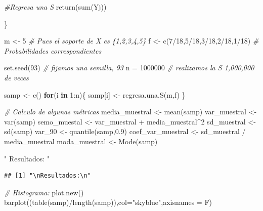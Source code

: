 \documentclass[
]{article}
\newenvironment{Shaded}{\begin{snugshade}}{\end{snugshade}}
\newcommand{\AttributeTok}[1]{\textcolor[rgb]{0.77,0.63,0.00}{#1}}
\newcommand{\CommentTok}[1]{\textcolor[rgb]{0.56,0.35,0.01}{\textit{#1}}}
\newcommand{\ControlFlowTok}[1]{\textcolor[rgb]{0.13,0.29,0.53}{\textbf{#1}}}
\newcommand{\DecValTok}[1]{\textcolor[rgb]{0.00,0.00,0.81}{#1}}
\newcommand{\FloatTok}[1]{\textcolor[rgb]{0.00,0.00,0.81}{#1}}
\newcommand{\FunctionTok}[1]{\textcolor[rgb]{0.00,0.00,0.00}{#1}}
\newcommand{\NormalTok}[1]{#1}
\newcommand{\OtherTok}[1]{\textcolor[rgb]{0.56,0.35,0.01}{#1}}
\newcommand{\SpecialCharTok}[1]{\textcolor[rgb]{0.00,0.00,0.00}{#1}}
\newcommand{\StringTok}[1]{\textcolor[rgb]{0.31,0.60,0.02}{#1}}
\begin{document}
\begin{Shaded}
\begin{Highlighting}[]
  \CommentTok{\#Regresa una S}
  \FunctionTok{return}\NormalTok{(}\FunctionTok{sum}\NormalTok{(Yj))}
  
\NormalTok{\}}

\NormalTok{m }\OtherTok{\textless{}{-}} \DecValTok{5} \CommentTok{\# Pues el soporte de X es \{1,2,3,4,5\}}
\NormalTok{f }\OtherTok{\textless{}{-}} \FunctionTok{c}\NormalTok{(}\DecValTok{7}\SpecialCharTok{/}\DecValTok{18}\NormalTok{,}\DecValTok{5}\SpecialCharTok{/}\DecValTok{18}\NormalTok{,}\DecValTok{3}\SpecialCharTok{/}\DecValTok{18}\NormalTok{,}\DecValTok{2}\SpecialCharTok{/}\DecValTok{18}\NormalTok{,}\DecValTok{1}\SpecialCharTok{/}\DecValTok{18}\NormalTok{) }\CommentTok{\# Probabilidades correspondientes}

\FunctionTok{set.seed}\NormalTok{(}\DecValTok{93}\NormalTok{) }\CommentTok{\# fijamos una semilla, 93}
\NormalTok{n }\OtherTok{=} \DecValTok{1000000} \CommentTok{\# realizamos la S 1,000,000 de veces}

\NormalTok{samp }\OtherTok{\textless{}{-}} \FunctionTok{c}\NormalTok{()}
\ControlFlowTok{for}\NormalTok{(i }\ControlFlowTok{in} \DecValTok{1}\SpecialCharTok{:}\NormalTok{n)\{}
\NormalTok{  samp[i] }\OtherTok{\textless{}{-}} \FunctionTok{regresa.una.S}\NormalTok{(m,f)}
\NormalTok{\}}

\CommentTok{\# Calculo de algunas métricas}
\NormalTok{media\_muestral }\OtherTok{\textless{}{-}} \FunctionTok{mean}\NormalTok{(samp)}
\NormalTok{var\_muestral }\OtherTok{\textless{}{-}} \FunctionTok{var}\NormalTok{(samp)}
\NormalTok{semo\_muestal }\OtherTok{\textless{}{-}}\NormalTok{ var\_muestral }\SpecialCharTok{+}\NormalTok{ media\_muestral}\SpecialCharTok{\^{}}\DecValTok{2}
\NormalTok{sd\_muestral }\OtherTok{\textless{}{-}}  \FunctionTok{sd}\NormalTok{(samp)}
\NormalTok{var\_90 }\OtherTok{\textless{}{-}} \FunctionTok{quantile}\NormalTok{(samp,}\FloatTok{0.9}\NormalTok{)}
\NormalTok{coef\_var\_muestral }\OtherTok{\textless{}{-}}\NormalTok{ sd\_muestral }\SpecialCharTok{/}\NormalTok{ media\_muestral}
\NormalTok{moda\_muestral }\OtherTok{\textless{}{-}} \FunctionTok{Mode}\NormalTok{(samp)}

\StringTok{"}
\StringTok{Resultados:}
\StringTok{"}
\end{Highlighting}
\end{Shaded}

\begin{verbatim}
## [1] "\nResultados:\n"
\end{verbatim}

\begin{Shaded}
\begin{Highlighting}[]
\CommentTok{\# Histograma:}
\FunctionTok{plot.new}\NormalTok{()}
\FunctionTok{barplot}\NormalTok{((}\FunctionTok{table}\NormalTok{(samp)}\SpecialCharTok{/}\FunctionTok{length}\NormalTok{(samp)),}\AttributeTok{col=}\StringTok{"skyblue"}\NormalTok{,}\AttributeTok{axisnames =}\NormalTok{ F)}
\end{Highlighting}
\end{Shaded}
\end{document}
